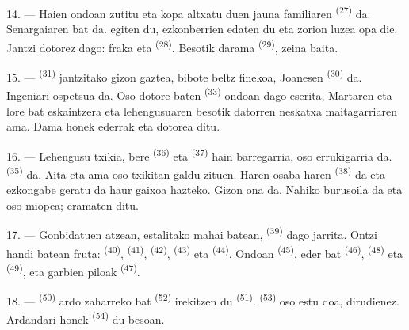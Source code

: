 14. --- Haien ondoan zutitu eta kopa altxatu duen jauna familiaren
 \textsuperscript{(27)} da. Senargaiaren  bat
da.  egiten du, ezkonberrien  edaten du eta
zorion luzea opa die. Jantzi dotorez dago: fraka eta 
\textsuperscript{(28)}. Besotik darama  \textsuperscript{(29)},
zeina  baita.

15. ---  \textsuperscript{(31)} jantzitako gizon gaztea, bibote
beltz finekoa, Joanesen  \textsuperscript{(30)} da. Ingeniari
ospetsua da. Oso  dotore baten \textsuperscript{(33)} ondoan dago
eserita, Martaren  eta lore bat eskaintzera eta
  lehengusuaren besotik datorren neskatxa
maitagarriaren ama. Dama honek  ederrak eta 
dotorea ditu.

16. --- Lehengusu txikia, bere  \textsuperscript{(36)} eta
 \textsuperscript{(37)} hain barregarria, oso errukigarria
da.  \textsuperscript{(35)} da. Aita eta ama oso txikitan galdu
zituen. Haren osaba haren  \textsuperscript{(38)} da eta
ezkongabe geratu da haur gaixoa hazteko. Gizon ona da. Nahiko burusoila da eta
oso miopea;  eramaten ditu.

\VUsaut{2.4mm}
\VUsaut{3.0mm}

17. --- Gonbidatuen atzean,  estalitako mahai batean,
 \textsuperscript{(39)} dago jarrita. Ontzi handi batean fruta:
 \textsuperscript{(40)}, 
\textsuperscript{(41)},  \textsuperscript{(42)},
 \textsuperscript{(43)} eta 
\textsuperscript{(44)}. Ondoan  \textsuperscript{(45)},
 eder bat \textsuperscript{(46)}, 
\textsuperscript{(48)} eta  \textsuperscript{(49)}, eta
 garbien piloak \textsuperscript{(47)}.

18. ---  \textsuperscript{(50)} ardo zaharreko
 bat \textsuperscript{(52)} irekitzen du 
\textsuperscript{(51)}.  \textsuperscript{(53)} oso estu doa,
dirudienez. Ardandari honek  \textsuperscript{(54)} du besoan.


